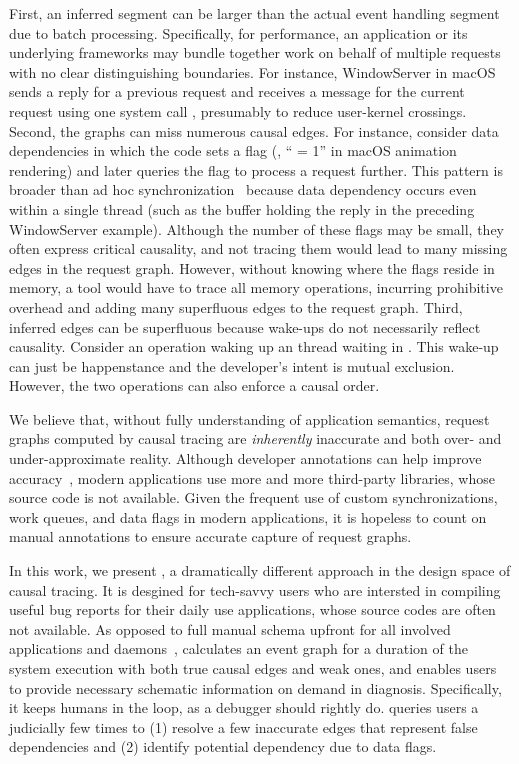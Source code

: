 First, an inferred segment can be larger than the actual event handling segment
due to batch processing. Specifically, for performance, an application or its
underlying frameworks may bundle together work on behalf of multiple requests
with no clear distinguishing boundaries. For instance, WindowServer in macOS
sends a reply for a previous request and receives a message for the current
request using one system call , presumably to
reduce user-kernel crossings. Second, the graphs can miss numerous causal
edges. For instance, consider data dependencies in which the code sets a flag
(\eg, `` = 1'' in macOS animation rendering) and later
queries the flag to process a request further. This pattern is broader than
ad hoc synchronization~\cite{xiong2010ad} because data dependency occurs
even within a single thread (such as the buffer holding the reply in the
preceding WindowServer example). Although the number of these flags may be
small, they often express critical causality, and not tracing them would lead
to many missing edges in the request graph. However, without knowing where
the flags reside in memory, a tool would have to trace all memory operations,
incurring prohibitive overhead and adding many superfluous edges to the request
graph. Third, inferred edges can be superfluous because wake-ups do not
necessarily reflect causality. Consider an  operation waking up an
thread waiting in . This wake-up can just be happenstance and the
developer's intent is mutual exclusion. However, the two operations can also
enforce a causal order.

We believe that, without fully understanding of application semantics, request
graphs computed by causal tracing are \emph{inherently} inaccurate and both
over- and under-approximate reality. Although developer annotations can help
improve accuracy~\cite{reynolds2006pip, fonseca2007x}, modern applications use
more and more third-party libraries, whose source code is not available. Given
the frequent use of custom synchronizations, work queues, and data flags in
modern applications, it is hopeless to count on manual annotations to ensure
accurate capture of request graphs.

In this work, we present \xxx, a dramatically different approach in the design
space of causal tracing. It is desgined for tech-savvy users who are intersted
in compiling useful bug reports for their daily use applications, whose source
codes are often not available. As opposed to full manual schema upfront for
all involved applications and daemons~\cite{barham2004using, reynolds2006pip,
fonseca2007x}, \xxx calculates an event graph for a duration of the system
execution with both true causal edges and weak ones, and enables users to
provide necessary schematic information on demand in diagnosis. Specifically, it
keeps humans in the loop, as a debugger should rightly do. \xxx queries users a
judicially few times to (1) resolve a few inaccurate edges that represent false
dependencies and (2) identify potential dependency due to data flags.

